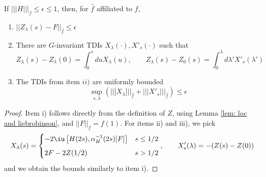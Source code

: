 \begin{lemma}\label{lem: loop is small}
	If  $|||H|||_f\leq  \epsilon \leq  1$, then, for $\hat{f}$ affiliated to $f$,
	\begin{enumerate}
		\item  $
		||Z_\lambda(s)-F||_{\hat{f}} \leq   \epsilon  
		$
		\item  There are $G$-invariant TDIs $X_\lambda(\cdot), X'_s(\cdot)$ such that 
		$$
		Z_{\lambda}(s)-Z_{\lambda}(0)=\int_{0}^{s} du X_\lambda(u), \qquad    Z_{\lambda}(s)-Z_{0}(s)=\int_{0}^{\lambda} d\lambda' X'_s(\lambda') 
		$$
		\item  The TDIs  from item $ii)$ are uniformly bounded 
		$$ \sup_{s,\lambda} (||| X_\lambda |||_{\hat{f}}+ ||| X'_s |||_{\hat{f}}) \leq \epsilon
		$$
	\end{enumerate}
\end{lemma}
\begin{proof}
	Item i) follows directly from the definition of $Z$, using Lemma \ref{lem: loc and liebrobinson}, and $||F||_f =f(1)$. 
	For items ii) and iii), we pick
	$$
	X_\lambda(s)= \begin{cases} -2\iu \left[H(2s),\alpha_H^{-1}(2s)[F]\right] &  s\leq 1/2  \\[2mm]
		2F-2Z(1/2)  & s>1/2  \end{cases},\qquad  X'_s(\lambda)= - (Z(s)-Z(0))
	$$ 
	and we obtain the bounds similarly to item i). 
\end{proof}

